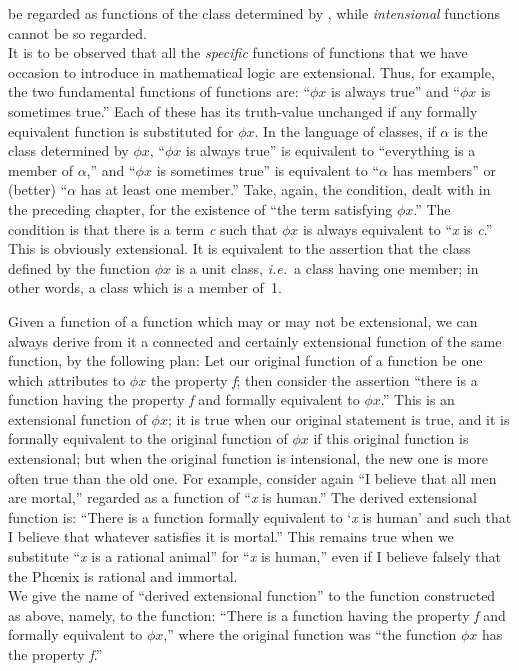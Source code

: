 {be regarded as functions of the class determined by , while
\textit{intensional}
functions cannot be so regarded.\\
\indent It is to be observed that all the
\textit{specific}
functions of
functions that
we have occasion to introduce in mathematical logic are extensional.
Thus, for example, the two fundamental functions of functions are:
``$\phi x$ is
always true'' and ``$\phi x$
is
sometimes true.'' Each of these has its truth-value unchanged if any
formally equivalent function is substituted for $\phi x$. In
the language of classes, if \ensuremath{\alpha} is the class determined
by $\phi x$,
``$\phi x$ is
always true'' is equivalent to
``everything is a member of \ensuremath{\alpha},'' and ``$\phi x$ is sometimes
true'' is equivalent to ``\ensuremath{\alpha} has members'' or (better) ``\ensuremath{\alpha} has at least one
member.'' Take, again, the condition, dealt with in the preceding
chapter, for the existence of ``the term satisfying $\phi x$.'' The
condition is that there is a term \textit{c}
such that $\phi x$
is always equivalent
to ``\textit{x} is \textit{c}.'' This is
obviously extensional. It is equivalent to the
assertion that the class defined by the function $\phi x$ is a unit
class, \textit{i.e.}\ a class having one member; in other words, a class which is
a member of~1.

Given a function of a function which may
or may not be
extensional, we
can always derive from it a connected and certainly extensional
function of the same function, by the following plan: Let our original
function of a function be one which attributes to $\phi x$
the property \textit{f};
then consider the assertion ``there is a function
having the property \textit{f}
and formally equivalent to $\phi x$.'' This is an
extensional function of $\phi x$;
it is true when our
original statement is true, and it is formally equivalent to the
original function of $\phi x$
if this original function is
extensional; but when the original function is intensional, the new one
is more often true than the old one. For example, consider again ``I
believe that all men are mortal,'' regarded as a function of ``\textit{x} is
human.'' The derived extensional function is: ``There is a function
formally equivalent to `\textit{x}
is human' and such that I believe
that
whatever satisfies it is mortal.'' This remains true when we substitute ``\textit{x}
is a rational
animal''   for ``\textit{x} is
human,'' even if I believe falsely that the Ph{\oe}nix is rational and
immortal.\\
\indent We give the name of ``derived extensional
function'' to the
function
constructed as above, namely, to the function: ``There is a function
having the property \textit{f}
and formally equivalent to $\phi x$,'' where the
original function was ``the function $\phi x$ has the property \textit{f}.''}
